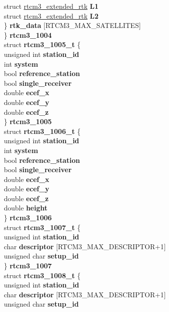 \begin{DoxyCompactItemize}
{\begin{tabbing}
\>\>\>struct \hyperlink{structrtcm3__extended__rtk}{rtcm3\_extended\_rtk} {\bfseries L1}\\
\>\>\>struct \hyperlink{structrtcm3__extended__rtk}{rtcm3\_extended\_rtk} {\bfseries L2}\\
\>\>\} {\bfseries rtk\_data} \mbox{[}RTCM3\_MAX\_SATELLITES\mbox{]}\\
\>\} {\bfseries rtcm3\_1004}\\
\>struct {\bfseries rtcm3\_1005\_t} \{\\
\>\>unsigned int {\bfseries station\_id}\\
\>\>int {\bfseries system}\\
\>\>bool {\bfseries reference\_station}\\
\>\>bool {\bfseries single\_receiver}\\
\>\>double {\bfseries ecef\_x}\\
\>\>double {\bfseries ecef\_y}\\
\>\>double {\bfseries ecef\_z}\\
\>\} {\bfseries rtcm3\_1005}\\
\>struct {\bfseries rtcm3\_1006\_t} \{\\
\>\>unsigned int {\bfseries station\_id}\\
\>\>int {\bfseries system}\\
\>\>bool {\bfseries reference\_station}\\
\>\>bool {\bfseries single\_receiver}\\
\>\>double {\bfseries ecef\_x}\\
\>\>double {\bfseries ecef\_y}\\
\>\>double {\bfseries ecef\_z}\\
\>\>double {\bfseries height}\\
\>\} {\bfseries rtcm3\_1006}\\
\>struct {\bfseries rtcm3\_1007\_t} \{\\
\>\>unsigned int {\bfseries station\_id}\\
\>\>char {\bfseries descriptor} \mbox{[}RTCM3\_MAX\_DESCRIPTOR+1\mbox{]}\\
\>\>unsigned char {\bfseries setup\_id}\\
\>\} {\bfseries rtcm3\_1007}\\
\>struct {\bfseries rtcm3\_1008\_t} \{\\
\>\>unsigned int {\bfseries station\_id}\\
\>\>char {\bfseries descriptor} \mbox{[}RTCM3\_MAX\_DESCRIPTOR+1\mbox{]}\\
\>\>unsigned char {\bfseries setup\_id}\\

\end{tabbing}}
\end{DoxyCompactItemize}
